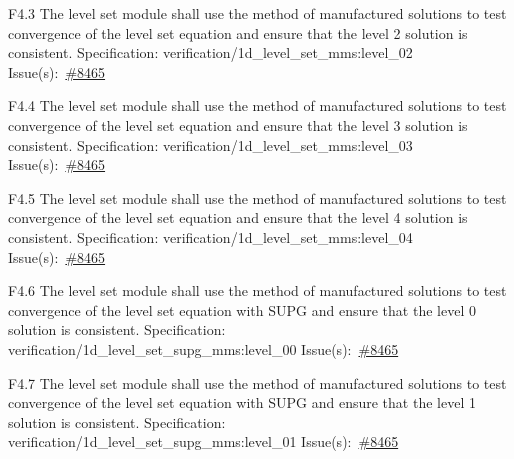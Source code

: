 \begin{Requirement}{F4.3}
The level set module shall use the method of manufactured solutions to test convergence of the level set equation and ensure that the level 2 solution is consistent.
\newline
Specification: verification/1d\_level\_set\_mms:level\_02
\newline
Issue(s):~\href{https://github.com/idaholab/moose/issues/8465}{\#8465}
\end{Requirement}

\begin{Requirement}{F4.4}
The level set module shall use the method of manufactured solutions to test convergence of the level set equation and ensure that the level 3 solution is consistent.
\newline
Specification: verification/1d\_level\_set\_mms:level\_03
\newline
Issue(s):~\href{https://github.com/idaholab/moose/issues/8465}{\#8465}
\end{Requirement}

\begin{Requirement}{F4.5}
The level set module shall use the method of manufactured solutions to test convergence of the level set equation and ensure that the level 4 solution is consistent.
\newline
Specification: verification/1d\_level\_set\_mms:level\_04
\newline
Issue(s):~\href{https://github.com/idaholab/moose/issues/8465}{\#8465}
\end{Requirement}

\begin{Requirement}{F4.6}
The level set module shall use the method of manufactured solutions to test convergence of the level set equation with SUPG and ensure that the level 0 solution is consistent.
\newline
Specification: verification/1d\_level\_set\_supg\_mms:level\_00
\newline
Issue(s):~\href{https://github.com/idaholab/moose/issues/8465}{\#8465}
\end{Requirement}

\begin{Requirement}{F4.7}
The level set module shall use the method of manufactured solutions to test convergence of the level set equation with SUPG and ensure that the level 1 solution is consistent.
\newline
Specification: verification/1d\_level\_set\_supg\_mms:level\_01
\newline
Issue(s):~\href{https://github.com/idaholab/moose/issues/8465}{\#8465}
\end{Requirement}

